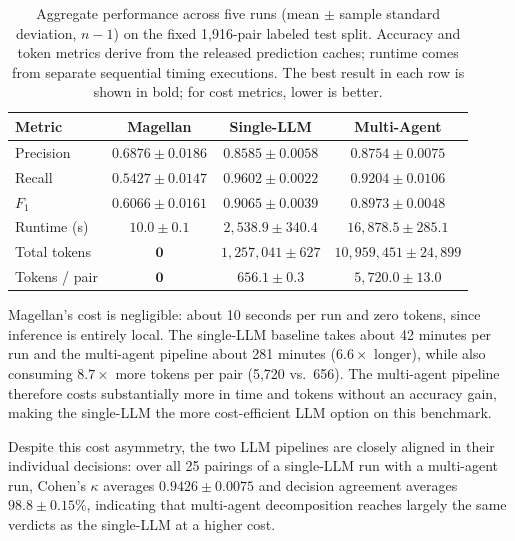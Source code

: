 \documentclass[sigconf]{acmart}
\begin{document}
\begin{table}[h]
  \centering
  \caption{Aggregate performance across five runs (mean $\pm$ sample standard deviation, $n-1$) on the fixed 1,916-pair labeled test split. Accuracy and token metrics derive from the released prediction caches; runtime comes from separate sequential timing executions. The best result in each row is shown in bold; for cost metrics, lower is better.}
  \label{tab:main-results}
  \small
  \begin{tabular}{lccc}
    \toprule
    \textbf{Metric} & \textbf{Magellan} & \textbf{Single-LLM} & \textbf{Multi-Agent} \\
    \midrule
    Precision     & $0.6876 \pm 0.0186$ & $0.8585 \pm 0.0058$  & $\mathbf{0.8754 \pm 0.0075}$  \\
    Recall        & $0.5427 \pm 0.0147$ & $\mathbf{0.9602 \pm 0.0022}$  & $0.9204 \pm 0.0106$  \\
    $F_1$         & $0.6066 \pm 0.0161$ & $\mathbf{0.9065 \pm 0.0039}$  & $0.8973 \pm 0.0048$  \\
    Runtime (s)   & $\mathbf{10.0 \pm 0.1}$      & $2{,}538.9 \pm 340.4$ & $16{,}878.5 \pm 285.1$ \\
    Total tokens  & $\mathbf{0}$                 & $1{,}257{,}041 \pm 627$ & $10{,}959{,}451 \pm 24{,}899$ \\
    Tokens / pair & $\mathbf{0}$                 & $656.1 \pm 0.3$       & $5{,}720.0 \pm 13.0$ \\
    \bottomrule
  \end{tabular}
\end{table}

Magellan's cost is negligible: about 10 seconds per run and zero tokens, since inference is entirely local.
The single-LLM baseline takes about 42 minutes per run and the multi-agent pipeline about 281 minutes ($6.6\times$ longer), while also consuming $8.7\times$ more tokens per pair (5,720 vs.\ 656).
The multi-agent pipeline therefore costs substantially more in time and tokens without an accuracy gain, making the single-LLM the more cost-efficient LLM option on this benchmark.

Despite this cost asymmetry, the two LLM pipelines are closely aligned in their individual decisions: over all 25 pairings of a single-LLM run with a multi-agent run, Cohen's $\kappa$ averages $0.9426 \pm 0.0075$ and decision agreement averages $98.8 \pm 0.15\%$, indicating that multi-agent decomposition reaches largely the same verdicts as the single-LLM at a higher cost.
\end{document}
